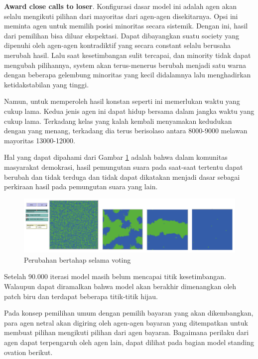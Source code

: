 \textbf{Award close calls to loser}. Konfigurasi dasar model ini adalah agen akan selalu mengikuti pilihan dari mayoritas dari agen-agen disekitarnya. Opsi ini meminta agen untuk memilih posisi minoritas secara sistemik. Dengan ini, hasil dari pemilihan bisa diluar ekspektasi. Dapat dibayangkan suatu society yang dipenuhi oleh agen-agen kontradiktif yang secara constant selalu berusaha merubah hasil. Lalu saat kesetimbangan sulit tercapai, dan minority tidak dapat mengubah pilihannya, system akan terus-menerus berubah menjadi satu warna dengan beberapa gelembung minoritas yang kecil didalamnya lalu menghadirkan ketidakstabilan yang tinggi.

Namun, untuk memperoleh hasil konstan seperti ini memerlukan waktu yang cukup lama. Kedua jenis agen ini dapat hidup bersama dalam jangka waktu yang cukup lama. Terkadang kelas yang kalah kembali menyamakan kedudukan dengan yang menang, terkadang dia terus berisolaso antara 8000-9000 melawan mayoritas 13000-12000.

Hal yang dapat dipahami dari Gambar \ref{fig:voter4} adalah bahwa dalam komunitas masyarakat demokrasi, hasil pemungutan suara pada saat-saat tertentu dapat berubah dan tidak terduga dan tidak dapat dikatakan menjadi dasar sebagai perkiraan hasil pada pemungutan suara yang lain.

\begin{figure}[H]
	\centering
	\includegraphics[width=\linewidth]{images/ch03/Voter4}
	\caption{Perubahan bertahap selama voting}
	\label{fig:voter4}
\end{figure}

Setelah 90.000 iterasi model masih belum mencapai titik kesetimbangan. Walaupun dapat diramalkan bahwa model akan berakhir dimenangkan oleh patch biru dan terdapat beberapa titik-titik hijau.

Pada konsep pemilihan umum dengan pemilih bayaran yang akan dikembangkan, para agen netral akan digiring oleh agen-agen bayaran yang ditempatkan untuk membuat pilihan mengikuti pilihan dari agen bayaran. Bagaimana perilaku dari agen dapat terpengaruh oleh agen lain, dapat dilihat pada bagian model standing ovation berikut.

